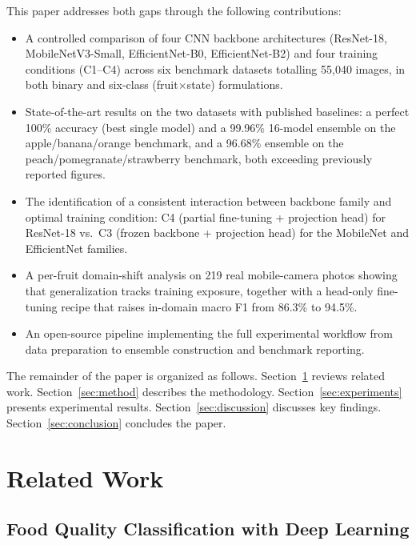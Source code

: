 \documentclass[conference]{IEEEtran}
\begin{document}
This paper addresses both gaps through the following contributions:
\begin{itemize}
    \item A controlled comparison of four CNN backbone architectures
    (ResNet-18, MobileNetV3-Small, EfficientNet-B0, EfficientNet-B2) and
    four training conditions (C1--C4) across six benchmark datasets
    totalling 55,040 images, in both binary and six-class
    (fruit$\times$state) formulations.
    \item State-of-the-art results on the two datasets with published
    baselines: a perfect 100\% accuracy (best single model) and a 99.96\%
    16-model ensemble on the apple/banana/orange benchmark, and a 96.68\%
    ensemble on the peach/pomegranate/strawberry benchmark, both exceeding
    previously reported figures.
    \item The identification of a consistent interaction between backbone
    family and optimal training condition: C4 (partial fine-tuning +
    projection head) for ResNet-18 vs.\ C3 (frozen backbone + projection
    head) for the MobileNet and EfficientNet families.
    \item A per-fruit domain-shift analysis on 219 real mobile-camera
    photos showing that generalization tracks training exposure, together
    with a head-only fine-tuning recipe that raises in-domain macro F1
    from 86.3\% to 94.5\%.
    \item An open-source pipeline implementing the full experimental
    workflow from data preparation to ensemble construction and
    benchmark reporting.
\end{itemize}

The remainder of the paper is organized as follows.
Section~\ref{sec:related} reviews related work.
Section~\ref{sec:method} describes the methodology.
Section~\ref{sec:experiments} presents experimental results.
Section~\ref{sec:discussion} discusses key findings.
Section~\ref{sec:conclusion} concludes the paper.

\section{Related Work}
\label{sec:related}

\subsection{Food Quality Classification with Deep Learning}
\end{document}
